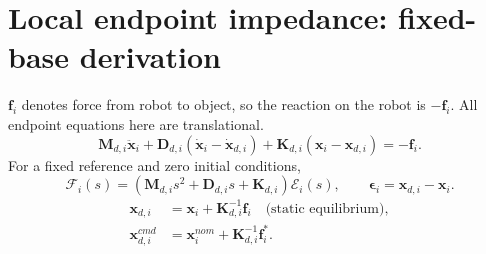 \documentclass[11pt]{article}
\newcommand{\vect}[1]{\bm{#1}}
\begin{document}
\section*{Local endpoint impedance: fixed-base derivation}
\noindent $\vect f_i$ denotes force from robot to object, so the reaction
on the robot is $-\vect f_i$. All endpoint equations here are translational.
\begin{equation}
\vect M_{d,i}\ddot{\vect x}_i
+\vect D_{d,i}(\dot{\vect x}_i-\dot{\vect x}_{d,i})
+\vect K_{d,i}(\vect x_i-\vect x_{d,i})=-\vect f_i.
\tag{DIMP-01}
\end{equation}
For a fixed reference and zero initial conditions,
\begin{equation}
\mathcal F_i(s)=(\vect M_{d,i}s^2+\vect D_{d,i}s+\vect K_{d,i})
\mathcal E_i(s),\qquad\vect\epsilon_i=\vect x_{d,i}-\vect x_i.
\tag{DIMP-02}
\end{equation}
\begin{align}
\vect x_{d,i}&=\vect x_i+\vect K_{d,i}^{-1}\vect f_i
\quad\text{(static equilibrium)},\tag{DIMP-03}\\
\vect x_{d,i}^{cmd}&=\vect x_i^{nom}+\vect K_{d,i}^{-1}\vect f_i^*.
\tag{DIMP-04}
\end{align}
\end{document}
